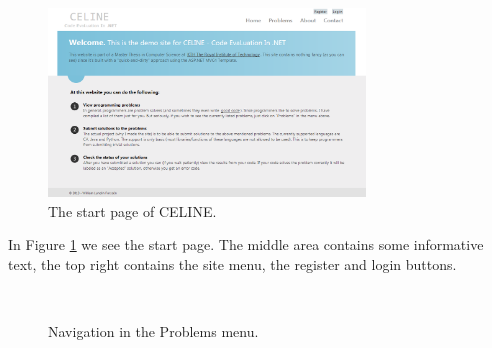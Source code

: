\begin{figure}[h]
	\centering
	\includegraphics[width=0.75\textwidth]{chapters/media/celine_startpage.png}
	\caption{The start page of CELINE.}
	\label{fig:celine_startpage}
\end{figure}

In Figure \ref{fig:celine_startpage} we see the start page. The middle area contains some informative text, the top right contains the site menu, the register and login buttons.

\begin{figure}[h]
\centering
\mbox{
}
\caption{Navigation in the Problems menu.}
\label{fig:celine_split_problemlist_easysort}
\end{figure}

